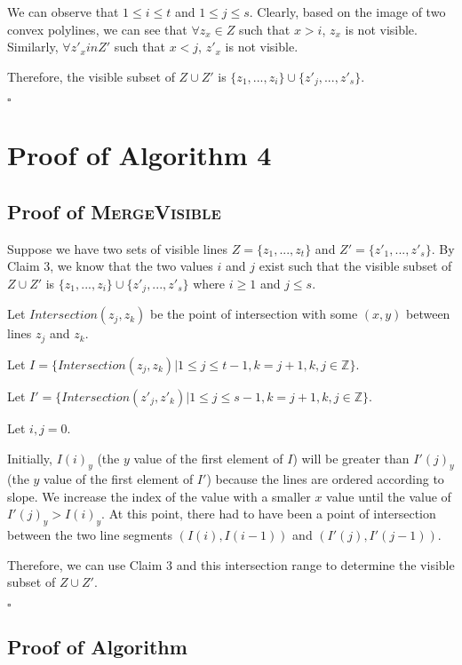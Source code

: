 \documentclass[12pt,letterpaper]{article}
\begin{document}
We can observe that $1 \leq i \leq t$ and $1 \leq j \leq s$. Clearly, based on the image of two convex polylines, we can see that $\forall z_x \in Z$ such that $x > i$, $z_x$ is not visible. Similarly, $\forall z'_x in Z'$ such that $x < j$, $z'_x$ is not visible.

Therefore, the visible subset of $Z \cup Z'$ is $\{z_1, ..., z_i \} \cup \{ z'_j, ..., z'_s \}$.

$\square$

\section{Proof of Algorithm 4}

\subsection{Proof of \textsc{MergeVisible}}

Suppose we have two sets of visible lines $Z = \{ z_1, ..., z_t \}$ and $ Z' = \{ z'_1, ..., z'_s \}$.
By Claim 3, we know that the two values $i$ and $j$ exist such that the visible subset of $Z \cup Z'$ is 
$\{z_1, ..., z_i \} \cup \{ z'_j, ..., z'_s \}$ where $i \geq 1$ and $j \leq s$.

Let $Intersection(z_j, z_k)$ be the point of intersection with some $(x, y)$ between lines $z_j$ and $z_k$. 

Let $I  = \{ Intersection(z_j, z_k) | 1 \leq j \leq t - 1, k = j + 1, k, j \in \mathbb{Z} \}$.

Let $I' = \{ Intersection(z'_j, z'_k) | 1 \leq j \leq s - 1, k = j + 1, k, j \in \mathbb{Z}  \}$.

Let $i,j = 0$.

Initially, $I(i)_y$ (the $y$ value of the first element of $I$) will be greater than $I'(j)_y$ (the $y$ value of the first element of $I'$) because the lines are ordered according to slope. We increase the index of the value with a smaller $x$ value until the value of $I'(j)_y > I(i)_y$. At this point, there had to have been a point of intersection between the two line segments $(I(i), I(i-1))$ and $(I'(j), I'(j-1))$. 

Therefore, we can use Claim 3 and this intersection range to determine the visible subset of $Z \cup Z'$.

$\square$

\subsection{Proof of Algorithm}
\end{document}
